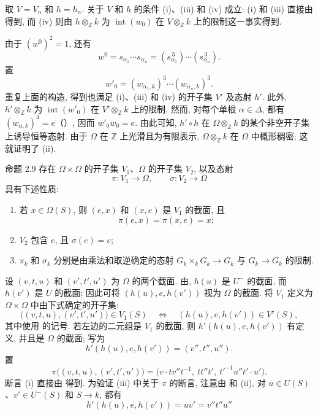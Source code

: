 取 \(V=V_n\) 和 \(h=h_n\). 关于 \(V\) 和 \(h\) 的条件 (i)、(iii) 和 (iv) 成立: (i) 和 (iii) 直接由 得到, 而 (iv) 则由 \(h\otimes_{\mathbb Z}k\) 为 \(\operatorname{int}(w_0)\) 在 \(V\otimes_{\mathbb Z}k\) 上的限制这一事实得到.

由于 \((w^0)^2=1\), 还有
\[
 w^0=s_{\alpha_1}\cdots s_{\alpha_n}
 =(s_{\alpha_1}^{\,3})\cdots(s_{\alpha_n}^{\,3}).
\]
置
\[
 w'_0=(w_{\alpha_1,k})^3\cdots(w_{\alpha_n,k})^3.
\]
重复上面的构造, 得到也满足 (i)、(iii) 和 (iv) 的开子集 \(V'\) 及态射 \(h'\). 此外, \(h'\otimes_{\mathbb Z}k\) 为 \(\operatorname{int}(w'_0)\) 在 \(V'\otimes_{\mathbb Z}k\) 上的限制. 然而, 对每个单根 \(\alpha\in\Delta\), 都有 \((w_{\alpha,k})^4=e\)（）, 因而 \(w'_0w_0=e\).
由此可知, \(h'\circ h\) 在 \(\Omega\otimes_{\mathbb Z}k\) 的某个非空开子集上诱导恒等态射. 由于 \(\Omega\) 在 \(\mathbb Z\) 上光滑且为有限表示, \(\Omega\otimes_{\mathbb Z}k\) 在 \(\Omega\) 中概形稠密; 这就证明了 (ii).

\begin{sgastatement}{命题 2.9}
存在 \(\Omega\times\Omega\) 的开子集 \(V_1\)、\(\Omega\) 的开子集 \(V_2\), 以及态射
\[
 \pi\colon V_1\longrightarrow\Omega,\qquad
 \sigma\colon V_2\longrightarrow\Omega
\]
具有下述性质:
\begin{enumerate}[label=\textup{(\roman*)},leftmargin=2.2em]
\item 若 \(x\in\Omega(S)\), 则 \((e,x)\) 和 \((x,e)\) 是 \(V_1\) 的截面, 且
\[
 \pi(e,x)=\pi(x,e)=x;
\]
\item \(V_2\) 包含 \(e\), 且 \(\sigma(e)=e\);
\item{} \(\pi_k\) 和 \(\sigma_k\) 分别是由乘法和取逆确定的态射 \(G_k\times_kG_k\to G_k\) 与 \(G_k\to G_k\) 的限制.
\end{enumerate}
\end{sgastatement}

\SGAProof
设 \((v,t,u)\) 和 \((v',t',u')\) 为 \(\Omega\) 的两个截面. 由, \(h(u)\) 是 \(U^-\) 的截面, 而 \(h(v')\) 是 \(U\) 的截面; 因此可将 \((h(u),e,h(v'))\) 视为 \(\Omega\) 的截面. 将 \(V_1\) 定义为 \(\Omega\times\Omega\) 中由下式确定的开子集:
\[
\bigl((v,t,u),(v',t',u')\bigr)\in V_1(S)
\quad\Longleftrightarrow\quad
(h(u),e,h(v'))\in V'(S),
\]
其中使用 的记号. 若左边的二元组是 \(V_1\) 的截面, 则 \(h'(h(u),e,h(v'))\) 有定义, 并且是 \(\Omega\) 的截面; 写为
\[
 h'(h(u),e,h(v'))=(v'',t'',u'').
\]
置
\[
 \pi\bigl((v,t,u),(v',t',u')\bigr)
 =
 \bigl(v\cdot t v''t^{-1},\ tt''t',\
 t'^{-1}u''t'\cdot u'\bigr).
\]
断言 (i) 直接由 得到. 为验证 (iii) 中关于 \(\pi\) 的断言, 注意由 和 (ii), 对 \(u\in U(S)\)、\(v'\in U^-(S)\) 和 \(S\to k\), 都有
\[
 h'(h(u),e,h(v'))=uv'=v''t''u''
\]

